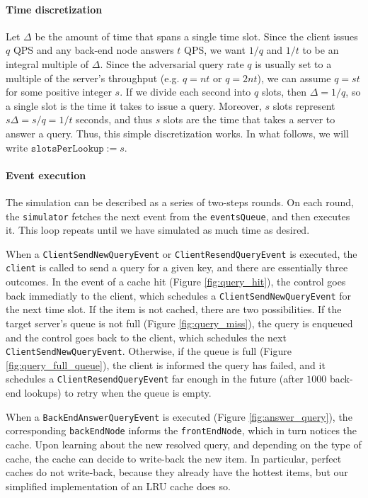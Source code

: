 \documentclass[10pt,letterpaper]{article}
\begin{document}
\paragraph{Time discretization}

Let $\Delta$ be the amount of time that spans a single time slot. Since the client issues $q$ QPS and any back-end node answers $t$ QPS, we want $1 / q$ and $1 / t$ to be an integral multiple of $\Delta$. Since the adversarial query rate $q$ is usually set to a multiple of the server's throughput (e.g. $q = nt$ or $q = 2nt$), we can assume $q = st$ for some positive integer $s$. If we divide each second into $q$ slots, then $\Delta = 1 / q$, so a single slot is the time it takes to issue a query. Moreover, $s$ slots represent $s\Delta = s / q = 1 / t$ seconds, and thus $s$ slots are the time that takes a server to answer a query. Thus, this simple discretization works. In what follows, we will write $\texttt{slotsPerLookup} := s$.

\paragraph{Event execution}

The simulation can be described as a series of two-steps rounds. On each round, the \texttt{simulator} fetches the next event from the \texttt{eventsQueue}, and then executes it. This loop repeats until we have simulated as much time as desired.

When a \texttt{ClientSendNewQueryEvent} or \texttt{ClientResendQueryEvent} is executed, the \texttt{client} is called to send a query for a given key, and there are essentially three outcomes. In the event of a cache hit (Figure \ref{fig:query_hit}), the control goes back immediatly to the client, which schedules a \texttt{ClientSendNewQueryEvent} for the next time slot. If the item is not cached, there are two possibilities. If the target server's queue is not full (Figure \ref{fig:query_miss}), the query is enqueued and the control goes back to the client, which schedules the next \texttt{ClientSendNewQueryEvent}. Otherwise, if the queue is full (Figure \ref{fig:query_full_queue}), the client is informed the query has failed, and it schedules a \texttt{ClientResendQueryEvent} far enough in the future (after $1000$ back-end lookups) to retry when the queue is empty.

When a \texttt{BackEndAnswerQueryEvent} is executed (Figure \ref{fig:answer_query}), the corresponding \texttt{backEndNode} informs the \texttt{frontEndNode}, which in turn notices the cache. Upon learning about the new resolved query, and depending on the type of cache, the cache can decide to write-back the new item. In particular, perfect caches do not write-back, because they already have the hottest items, but our simplified implementation of an LRU cache does so.
\end{document}
